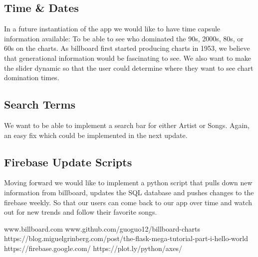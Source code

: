 \documentclass{article}
\begin{document}
\subsection*{Time \& Dates}
In a future instantiation of the app we would like to have time capsule information available: To be able to see who dominated the 90s, 2000s, 80s, or 60s on the charts. As billboard first started producing charts in 1953, we believe that generational information would be fascinating to see. We also want to make the slider dynamic so that the user could determine where they want to see chart domination times. 
\subsection*{Search Terms}
We want to be able to implement a search bar for either Artist or Songs. Again, an easy fix which could be implemented in the next update.  
\subsection*{Firebase Update Scripts}
Moving forward we would like to implement a python script that pulls down new  information from billboard, updates the SQL database and pushes changes to the firebase weekly. So that our users can come back to our app over time and watch out for new trends and follow their favorite songs.







\begin{thebibliography}{00}
www.billboard.com
www.github.com/guoguo12/billboard-charts
https://blog.miguelgrinberg.com/post/the-flask-mega-tutorial-part-i-hello-world
https://firebase.google.com/
https://plot.ly/python/axes/
\end{thebibliography}
\end{document}
